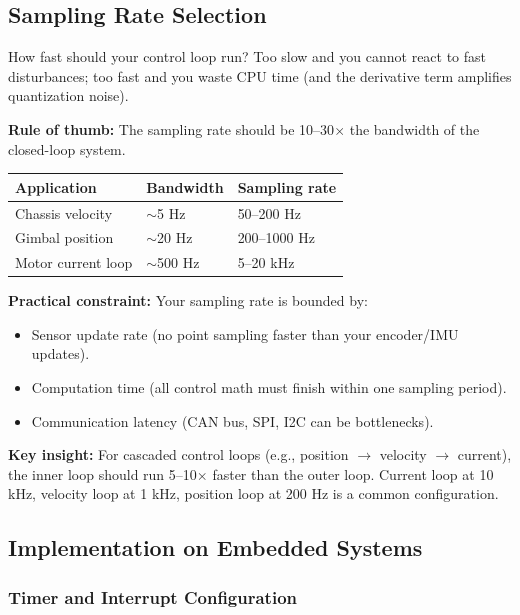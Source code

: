 \subsection{Sampling Rate Selection}

How fast should your control loop run? Too slow and you cannot react to fast disturbances; too fast and you waste CPU time (and the derivative term amplifies quantization noise).

\textbf{Rule of thumb:} The sampling rate should be 10--30$\times$ the bandwidth of the closed-loop system.

\begin{center}
\begin{tabular}{lll}
\toprule
\textbf{Application} & \textbf{Bandwidth} & \textbf{Sampling rate} \\
\midrule
Chassis velocity & $\sim$5 Hz & 50--200 Hz \\
Gimbal position & $\sim$20 Hz & 200--1000 Hz \\
Motor current loop & $\sim$500 Hz & 5--20 kHz \\
\bottomrule
\end{tabular}
\end{center}

\textbf{Practical constraint:} Your sampling rate is bounded by:
\begin{itemize}
    \item Sensor update rate (no point sampling faster than your encoder/IMU updates).
    \item Computation time (all control math must finish within one sampling period).
    \item Communication latency (CAN bus, SPI, I2C can be bottlenecks).
\end{itemize}

\textbf{Key insight:} For cascaded control loops (e.g., position $\to$ velocity $\to$ current), the inner loop should run 5--10$\times$ faster than the outer loop. Current loop at 10 kHz, velocity loop at 1 kHz, position loop at 200 Hz is a common configuration.

\subsection{Implementation on Embedded Systems}

\subsubsection{Timer and Interrupt Configuration}

